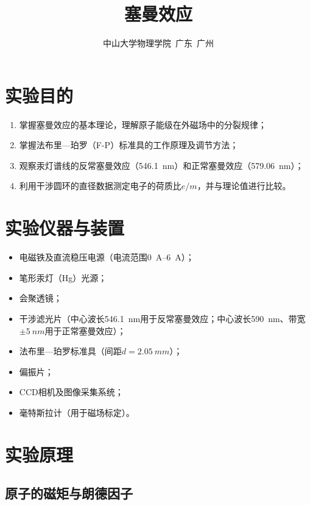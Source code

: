 \documentclass[a4paper,8pt,twocolumn]{article}
\title{
  \textbf{\huge 塞曼效应}
}
\author{
  \small 中山大学物理学院~广东~广州
}
\begin{document}
\maketitle
\newpage

\section{实验目的}

\begin{enumerate}
  \item 掌握塞曼效应的基本理论，理解原子能级在外磁场中的分裂规律；
  \item 掌握法布里—珀罗（F-P）标准具的工作原理及调节方法；
  \item 观察汞灯谱线的反常塞曼效应（\SI{546.1}{nm}）和正常塞曼效应（\SI{579.06}{nm}）；
  \item 利用干涉圆环的直径数据测定电子的荷质比$e/m$，并与理论值进行比较。
\end{enumerate}

\section{实验仪器与装置}

\begin{itemize}
  \item 电磁铁及直流稳压电源（电流范围\SIrange{0}{6}{A}）；
  \item 笔形汞灯（Hg）光源；
  \item 会聚透镜；
  \item 干涉滤光片（中心波长\SI{546.1}{nm}用于反常塞曼效应；中心波长\SI{590}{nm}、带宽$\pm\SI{5}{nm}$用于正常塞曼效应）；
  \item 法布里—珀罗标准具（间距$d=\SI{2.05}{mm}$）；
  \item 偏振片；
  \item CCD相机及图像采集系统；
  \item 毫特斯拉计（用于磁场标定）。
\end{itemize}

\section{实验原理}

\subsection{原子的磁矩与朗德因子}
\end{document}
